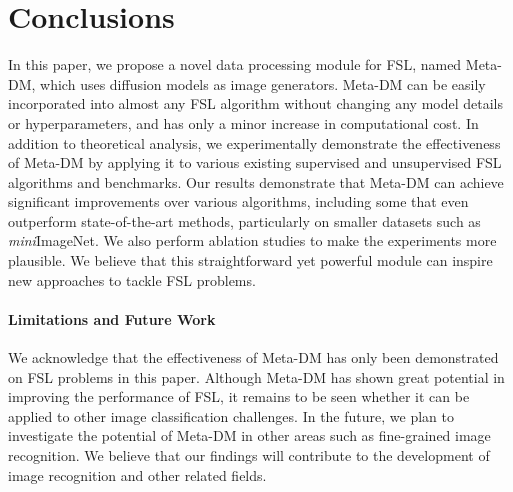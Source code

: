 \documentclass{article}
\begin{document}
\section{Conclusions}


In this paper, we propose a novel data processing module for FSL, named Meta-DM, which uses diffusion models as image generators. Meta-DM can be easily incorporated into almost any FSL algorithm without changing any model details or hyperparameters, and has only a minor increase in computational cost. In addition to theoretical analysis, we experimentally demonstrate the effectiveness of Meta-DM by applying it to various existing supervised and unsupervised FSL algorithms and benchmarks. Our results demonstrate that Meta-DM can achieve significant improvements over various algorithms, including some that even outperform state-of-the-art methods, particularly on smaller datasets such as \textit{mini}ImageNet. We also perform ablation studies to make the experiments more plausible. We believe that this straightforward yet powerful module can inspire new approaches to tackle FSL problems. 


\paragraph{Limitations and Future Work} We acknowledge that the effectiveness of Meta-DM has only been demonstrated on FSL problems in this paper. Although Meta-DM has shown great potential in improving the performance of FSL, it remains to be seen whether it can be applied to other image classification challenges. In the future, we plan to investigate the potential of Meta-DM in other areas such as fine-grained image recognition. We believe that our findings will contribute to the development of image recognition and other related fields.
\end{document}
